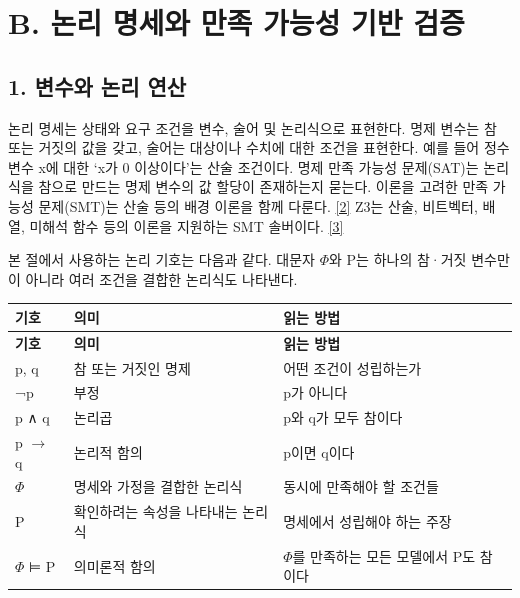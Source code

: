 \documentclass[11pt,a4paper]{article}
\begin{document}
\section*{B. 논리 명세와 만족 가능성 기반 검증}

\subsection*{1. 변수와 논리 연산}

논리 명세는 상태와 요구 조건을 변수, 술어 및 논리식으로 표현한다. 명제 변수는 참 또는 거짓의 값을 갖고, 술어는 대상이나 수치에 대한 조건을 표현한다. 예를 들어 정수 변수 x에 대한 ‘x가 0 이상이다’는 산술 조건이다. 명제 만족 가능성 문제(SAT)는 논리식을 참으로 만드는 명제 변수의 값 할당이 존재하는지 묻는다. 이론을 고려한 만족 가능성 문제(SMT)는 산술 등의 배경 이론을 함께 다룬다. \href{\detokenize{https://theory.stanford.edu/~barrett/pubs/BT18.pdf}}{[2]} Z3는 산술, 비트벡터, 배열, 미해석 함수 등의 이론을 지원하는 SMT 솔버이다. \href{\detokenize{https://doi.org/10.1007/978-3-540-78800-3_24}}{[3]}\par

본 절에서 사용하는 논리 기호는 다음과 같다. 대문자 \ensuremath{\Phi}와 P는 하나의 참·거짓 변수만이 아니라 여러 조건을 결합한 논리식도 나타낸다.\par

\begingroup\small
\begin{longtable}{@{}>{\raggedright\arraybackslash}p{}>{\raggedright\arraybackslash}p{}>{\raggedright\arraybackslash}p{}@{}}
\toprule
\textbf{기호} & \textbf{의미} & \textbf{읽는 방법} \\
\midrule\endfirsthead
\toprule
\textbf{기호} & \textbf{의미} & \textbf{읽는 방법} \\
\midrule\endhead
\bottomrule\endfoot
p, q & 참 또는 거짓인 명제 & 어떤 조건이 성립하는가 \\
¬p & 부정 & p가 아니다 \\
p ∧ q & 논리곱 & p와 q가 모두 참이다 \\
p \ensuremath{\rightarrow} q & 논리적 함의 & p이면 q이다 \\
\ensuremath{\Phi} & 명세와 가정을 결합한 논리식 & 동시에 만족해야 할 조건들 \\
P & 확인하려는 속성을 나타내는 논리식 & 명세에서 성립해야 하는 주장 \\
\ensuremath{\Phi} ⊨ P & 의미론적 함의 & \ensuremath{\Phi}를 만족하는 모든 모델에서 P도 참이다 \\
\end{longtable}
\endgroup
\end{document}
